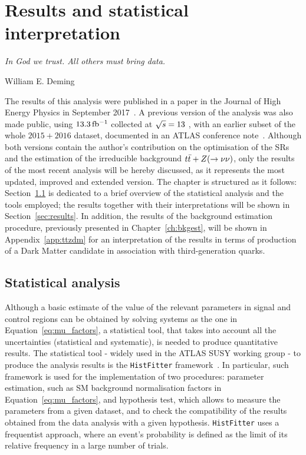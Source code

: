 \chapter{Results and statistical interpretation}
\label{ch:results}
\epigraph{\emph{In God we trust. All others must bring data.}}{William E. Deming}

	The results of this analysis were published in a paper in the Journal of High Energy Physics in September 2017~\cite{stop0L}. A previous version of the analysis was also made public, using $13.3\,\mbox{fb$^{-1}$}$ collected at $\sqrt{s} = 13$ \TeV, with an earlier subset of the whole $2015+2016$ dataset, documented in an ATLAS conference note~\cite{ICHEPstop0L}. Although both versions contain the author's contribution on the optimisation of the \acp{SR} and the estimation of the irreducible background $t\bar{t}+Z (\rightarrow \nu\nu)$, only the results of the most recent analysis will be hereby discussed, as it represents the most updated, improved and extended version. The chapter is structured as it follows: Section~\ref{sec:stat_ana} is dedicated to a brief overview of the statistical analysis and the tools employed; the results together with their interpretations will be shown in Section~\ref{sec:results}. In addition, the results of the background estimation procedure, previously presented in Chapter~\ref{ch:bkgest}, will be shown in Appendix~\ref{app:ttzdm} for an interpretation of the results in terms of production of a Dark Matter candidate in association with third-generation quarks.


	\section{Statistical analysis}
	\label{sec:stat_ana}

		Although a basic estimate of the value of the relevant parameters in signal and control regions can be obtained by solving systems as the one in Equation~\ref{eq:mu_factors}, a statistical tool, that takes into account all the uncertainties (statistical and systematic), is needed to produce quantitative results. The statistical tool - widely used in the ATLAS SUSY working group - to produce the analysis results is the \texttt{HistFitter} framework~\cite{histfitter}. In particular, such framework is used for the implementation of two procedures: parameter estimation, such as \ac{SM} background normalisation factors in Equation~\ref{eq:mu_factors}, and hypothesis test, which allows to measure the parameters from a given dataset, and to check the compatibility of the results obtained from the data analysis with a given hypothesis. \texttt{HistFitter} uses a frequentist approach, where an event's probability is defined as the limit of its relative frequency in a large number of trials.

